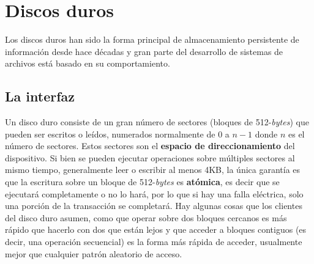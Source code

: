 \documentclass{article}
\begin{document}
	\section{Discos duros}
	Los discos duros han sido la forma principal de almacenamiento persistente de información desde hace décadas y gran parte del desarrollo de sistemas de archivos está basado en su comportamiento.
	
	\subsection{La interfaz}
	Un disco duro consiste de un gran número de sectores (bloques de 512-\textit{bytes}) que pueden ser escritos o leídos, numerados normalmente de $0$ a $n - 1$ donde $n$ es el número de sectores. Estos sectores son el \textbf{espacio de direccionamiento} del dispositivo. Si bien se pueden ejecutar operaciones sobre múltiples sectores al mismo tiempo, generalmente leer o escribir al menos 4KB, la única garantía es que la escritura sobre un bloque de 512-\textit{bytes} es \textbf{atómica}, es decir que se ejecutará completamente o no lo hará, por lo que si hay una falla eléctrica, solo una porción de la transacción se completará. Hay algunas cosas que los clientes del disco duro asumen, como que operar sobre dos bloques cercanos es más rápido que hacerlo con dos que están lejos y que acceder a bloques contiguos (es decir, una operación secuencial) es la forma más rápida de acceder, usualmente mejor que cualquier patrón aleatorio de acceso.
	
\end{document}
